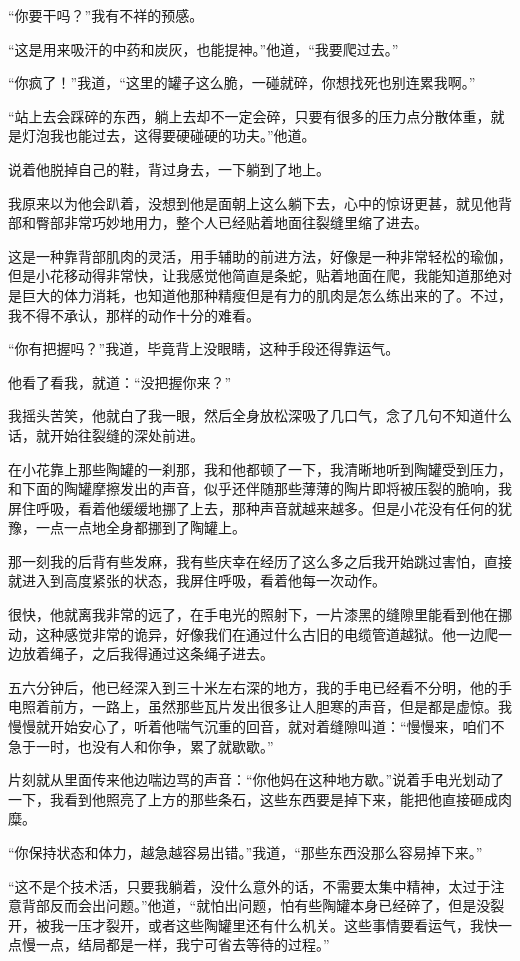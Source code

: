 “你要干吗？”我有不祥的预感。

“这是用来吸汗的中药和炭灰，也能提神。”他道，“我要爬过去。”

“你疯了！”我道，“这里的罐子这么脆，一碰就碎，你想找死也别连累我啊。”

“站上去会踩碎的东西，躺上去却不一定会碎，只要有很多的压力点分散体重，就是灯泡我也能过去，这得要硬碰硬的功夫。”他道。

说着他脱掉自己的鞋，背过身去，一下躺到了地上。

我原来以为他会趴着，没想到他是面朝上这么躺下去，心中的惊讶更甚，就见他背部和臀部非常巧妙地用力，整个人已经贴着地面往裂缝里缩了进去。

这是一种靠背部肌肉的灵活，用手辅助的前进方法，好像是一种非常轻松的瑜伽，但是小花移动得非常快，让我感觉他简直是条蛇，贴着地面在爬，我能知道那绝对是巨大的体力消耗，也知道他那种精瘦但是有力的肌肉是怎么练出来的了。不过，我不得不承认，那样的动作十分的难看。

“你有把握吗？”我道，毕竟背上没眼睛，这种手段还得靠运气。

他看了看我，就道：“没把握你来？”

我摇头苦笑，他就白了我一眼，然后全身放松深吸了几口气，念了几句不知道什么话，就开始往裂缝的深处前进。

在小花靠上那些陶罐的一刹那，我和他都顿了一下，我清晰地听到陶罐受到压力，和下面的陶罐摩擦发出的声音，似乎还伴随那些薄薄的陶片即将被压裂的脆响，我屏住呼吸，看着他缓缓地挪了上去，那种声音就越来越多。但是小花没有任何的犹豫，一点一点地全身都挪到了陶罐上。

那一刻我的后背有些发麻，我有些庆幸在经历了这么多之后我开始跳过害怕，直接就进入到高度紧张的状态，我屏住呼吸，看着他每一次动作。

很快，他就离我非常的远了，在手电光的照射下，一片漆黑的缝隙里能看到他在挪动，这种感觉非常的诡异，好像我们在通过什么古旧的电缆管道越狱。他一边爬一边放着绳子，之后我得通过这条绳子进去。

五六分钟后，他已经深入到三十米左右深的地方，我的手电已经看不分明，他的手电照着前方，一路上，虽然那些瓦片发出很多让人胆寒的声音，但是都是虚惊。我慢慢就开始安心了，听着他喘气沉重的回音，就对着缝隙叫道：“慢慢来，咱们不急于一时，也没有人和你争，累了就歇歇。”

片刻就从里面传来他边喘边骂的声音：“你他妈在这种地方歇。”说着手电光划动了一下，我看到他照亮了上方的那些条石，这些东西要是掉下来，能把他直接砸成肉糜。

“你保持状态和体力，越急越容易出错。”我道，“那些东西没那么容易掉下来。”

“这不是个技术活，只要我躺着，没什么意外的话，不需要太集中精神，太过于注意背部反而会出问题。”他道，“就怕出问题，怕有些陶罐本身已经碎了，但是没裂开，被我一压才裂开，或者这些陶罐里还有什么机关。这些事情要看运气，我快一点慢一点，结局都是一样，我宁可省去等待的过程。”

